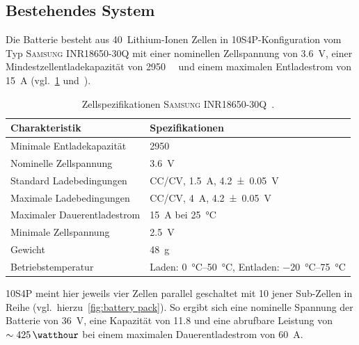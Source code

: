 		\subsection{Bestehendes System}
			Die Batterie besteht aus 40~Lithium-Ionen Zellen in 10S4P-Konfiguration vom Typ \textsc{Samsung INR18650-30Q} mit einer nominellen Zellspannung von \qty{3,6}{\volt}, einer Mindestzellentladekapazität von \qty{2950}{\milli\amperehour} und einem maximalen Entladestrom von \qty{15}{\ampere} (vgl.~\cref{tab:cellspecifications} und~\cite{INR18650.30Q.Specs.202202}).
			\begin{table}[h]
				\caption[Zellspezifikationen \textsc{Samsung INR18650-30Q}]{Zellspezifikationen \textsc{Samsung INR18650-30Q}~\cite{INR18650.30Q.Specs.202202}.}%
				\label{tab:cellspecifications}
				\centering
				\begin{tabular}{p{}l}
					\toprule
					Charakteristik				& Spezifikationen \\ \midrule
					Minimale Entladekapazität	& \qty{2950}{\milli\amperehour} \\
					Nominelle Zellspannung		& \qty{3,6}{\volt} \\
					Standard Ladebedingungen	& CC/CV, \qty{1,5}{\ampere}, \qty{4,2 +- 0,05}{\volt} \\
					Maximale Ladebedingungen	& CC/CV, \qty{4}{\ampere}, \qty{4,2 +- 0,05}{\volt} \\
					Maximaler Dauerentladestrom & \qty{15}{\ampere} bei \qty{25}{\degreeCelsius} \\
					Minimale Zellspannung		& \qty{2,5}{\volt} \\
					Gewicht						& \qty{48}{\gram} \\
					Betriebstemperatur			& Laden: \qtyrange{0}{50}{\degreeCelsius}, Entladen: \qtyrange{-20}{75}{\degreeCelsius} \\ \bottomrule
				\end{tabular}
			\end{table}
			10S4P meint hier jeweils vier Zellen parallel geschaltet mit 10 jener Sub-Zellen in Reihe (vgl.~hierzu~\cref{fig:battery pack}).
			So ergibt sich eine nominelle Spannung der Batterie von \qty{36}{\volt}, eine Kapazität von \qty{11,8}{\amperehour} und eine abrufbare Leistung von \(\sim \SI{425}{\watthour}\) bei einem maximalen Dauerentladestrom von \SI{60}{\ampere}.
